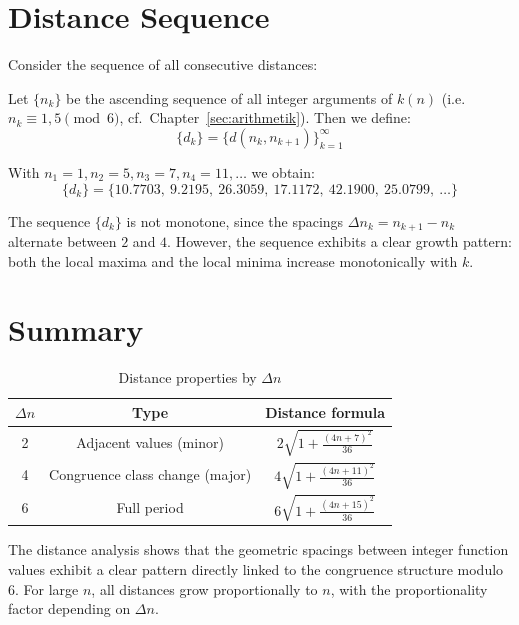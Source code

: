 \section{Distance Sequence}

Consider the sequence of all consecutive distances:

\begin{definition}
Let $\{n_k\}$ be the ascending sequence of all integer arguments of $k(n)$
(i.e.\ $n_k \equiv 1, 5 \pmod{6}$, cf.\ Chapter~\ref{sec:arithmetik}).
Then we define:
\begin{equation}
\{d_k\} = \{d(n_k, n_{k+1})\}_{k=1}^{\infty}
\end{equation}
\end{definition}

\begin{example}
With $n_1 = 1, n_2 = 5, n_3 = 7, n_4 = 11, \ldots$ we obtain:
\[
\{d_k\} = \{10.7703,\ 9.2195,\ 26.3059,\ 17.1172,\ 42.1900,\ 25.0799,\ \ldots\}
\]
\end{example}

\begin{remark}[Irregularity]
The sequence $\{d_k\}$ is not monotone, since the spacings
$\Delta n_k = n_{k+1} - n_k$ alternate between $2$ and $4$. However, the
sequence exhibits a clear growth pattern: both the local maxima and the local
minima increase monotonically with $k$.
\end{remark}

\section{Summary}

\begin{table}[H]
\centering
\caption{Distance properties by $\Delta n$}
\begin{tabular}{ccc}
\toprule
$\Delta n$ & Type & Distance formula \\
\midrule
2 & Adjacent values (minor) & $2\sqrt{1 + \frac{(4n+7)^2}{36}}$ \\
4 & Congruence class change (major) & $4\sqrt{1 + \frac{(4n+11)^2}{36}}$ \\
6 & Full period & $6\sqrt{1 + \frac{(4n+15)^2}{36}}$ \\
\bottomrule
\end{tabular}
\end{table}

\begin{remark}[Significance]
The distance analysis shows that the geometric spacings between integer
function values exhibit a clear pattern directly linked to the congruence
structure modulo~$6$. For large $n$, all distances grow proportionally to $n$,
with the proportionality factor depending on $\Delta n$.
\end{remark}

